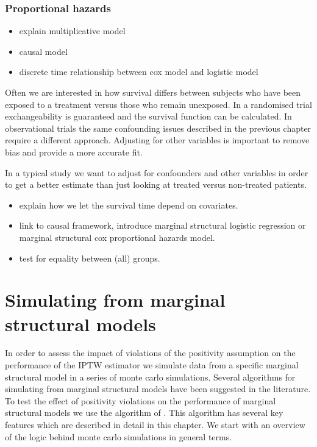 \documentclass[11pt]{article}
\providecommand{\tightlist}{%
      \setlength{\itemsep}{0pt}\setlength{\parskip}{0pt}}
\begin{document}
\subsubsection{Proportional hazards}\label{proportional-hazards}

\begin{itemize}
\tightlist
\item
  explain multiplicative model
\item
  causal model
\item
  discrete time relationship between cox model and logistic model
\end{itemize}

Often we are interested in how survival differs between subjects who
have been exposed to a treatment versus those who remain unexposed. In a
randomised trial exchangeability is guaranteed and the survival function
can be calculated. In observational trials the same confounding issues
described in the previous chapter require a different approach.
Adjusting for other variables is important to remove bias and provide a
more accurate fit.

In a typical study we want to adjust for confounders and other variables
in order to get a better estimate than just looking at treated versus
non-treated patients.

\begin{itemize}
\tightlist
\item
  explain how we let the survival time depend on covariates.
\item
  link to causal framework, introduce marginal structural logistic
  regression or marginal structural cox proportional hazards model.
\item
  test for equality between (all) groups.
\end{itemize}

    \newpage

    \section{Simulating from marginal structural
models}\label{simulating-from-marginal-structural-models}

In order to assess the impact of violations of the positivity assumption
on the performance of the IPTW estimator we simulate data from a
specific marginal structural model in a series of monte carlo
simulations. Several algorithms for simulating from marginal structural
models have been suggested in the literature. To test the effect of
positivity violations on the performance of marginal structural models
we use the algorithm of \citet{Havercroft2010}. This algorithm has
several key features which are described in detail in this chapter. We
start with an overview of the logic behind monte carlo simulations in
general terms.
\end{document}
